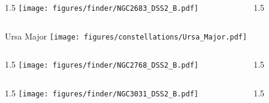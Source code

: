 \documentclass[final]{beamer}
\newlength{\colwidth}
\begin{document}

\begin{frame}[t]{}
    \begin{columns}[T]
        \begin{column}{1.5\colwidth}
            \centering
            \texttt{[image: figures/finder/NGC2683\_DSS2\_B.pdf]}
        \end{column}
        \begin{column}{1.5\colwidth}
            \Large
            
        \end{column}
    \end{columns}
    \vspace{\fill}
\end{frame}


\begin{frame}[t]{\LARGE Ursa Major}
    \centering
    \texttt{[image: figures/constellations/Ursa\_Major.pdf]}
\end{frame}


\begin{frame}[t]{}
    \begin{columns}[T]
        \begin{column}{1.5\colwidth}
            \centering
            \texttt{[image: figures/finder/NGC2768\_DSS2\_B.pdf]}
        \end{column}
        \begin{column}{1.5\colwidth}
            \Large
            
        \end{column}
    \end{columns}
    \vspace{\fill}
    \begin{columns}[T]
        \begin{column}{1.5\colwidth}
            \centering
            \texttt{[image: figures/finder/NGC3031\_DSS2\_B.pdf]}
        \end{column}
        \begin{column}{1.5\colwidth}
            \Large
            
        \end{column}
    \end{columns}
\end{frame}
\end{document}
